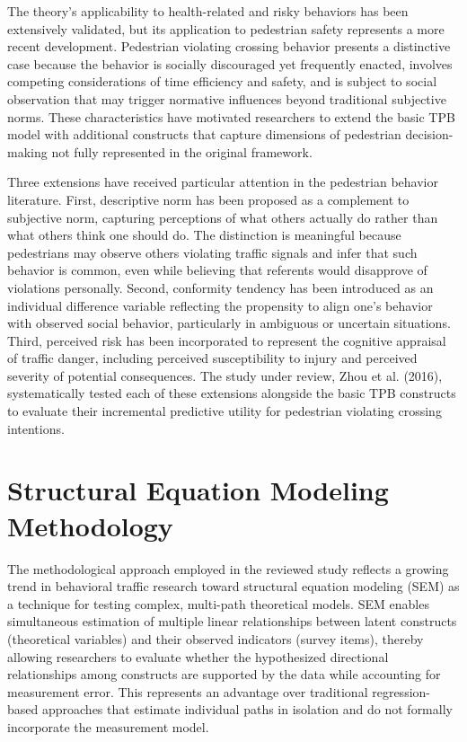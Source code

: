 \documentclass{article}
\begin{document}
The theory's applicability to health-related and risky behaviors has been extensively validated, but its application to pedestrian safety represents a more recent development. Pedestrian violating crossing behavior presents a distinctive case because the behavior is socially discouraged yet frequently enacted, involves competing considerations of time efficiency and safety, and is subject to social observation that may trigger normative influences beyond traditional subjective norms. These characteristics have motivated researchers to extend the basic TPB model with additional constructs that capture dimensions of pedestrian decision-making not fully represented in the original framework. \cite{08_2016_zhou_aap}

Three extensions have received particular attention in the pedestrian behavior literature. First, descriptive norm has been proposed as a complement to subjective norm, capturing perceptions of what others actually do rather than what others think one should do. The distinction is meaningful because pedestrians may observe others violating traffic signals and infer that such behavior is common, even while believing that referents would disapprove of violations personally. Second, conformity tendency has been introduced as an individual difference variable reflecting the propensity to align one's behavior with observed social behavior, particularly in ambiguous or uncertain situations. Third, perceived risk has been incorporated to represent the cognitive appraisal of traffic danger, including perceived susceptibility to injury and perceived severity of potential consequences. The study under review, Zhou et al. (2016), systematically tested each of these extensions alongside the basic TPB constructs to evaluate their incremental predictive utility for pedestrian violating crossing intentions. \cite{08_2016_zhou_aap}

\section{Structural Equation Modeling Methodology}
The methodological approach employed in the reviewed study reflects a growing trend in behavioral traffic research toward structural equation modeling (SEM) as a technique for testing complex, multi-path theoretical models. SEM enables simultaneous estimation of multiple linear relationships between latent constructs (theoretical variables) and their observed indicators (survey items), thereby allowing researchers to evaluate whether the hypothesized directional relationships among constructs are supported by the data while accounting for measurement error. This represents an advantage over traditional regression-based approaches that estimate individual paths in isolation and do not formally incorporate the measurement model. \cite{08_2016_zhou_aap}
\end{document}
